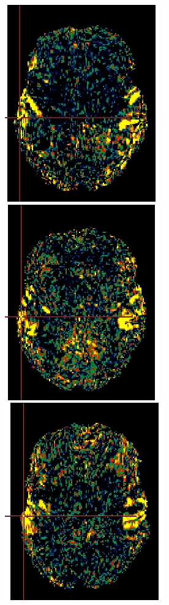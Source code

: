 \documentclass[pdftex,ptm,12pt,a4paper]{report}
\theoremstyle{definition}
\begin{document}
\begin{figure}[h]
\begin{multicols}{4}
\centering
\includegraphics[scale=0.5]{graphics/slices/sub3.png}
\centering
\includegraphics[scale=0.51]{graphics/slices/sub6.png}
\hfill
\centering
\includegraphics[scale=0.5]{graphics/slices/sub9.png}

\end{multicols}
\end{figure}
\end{document}

